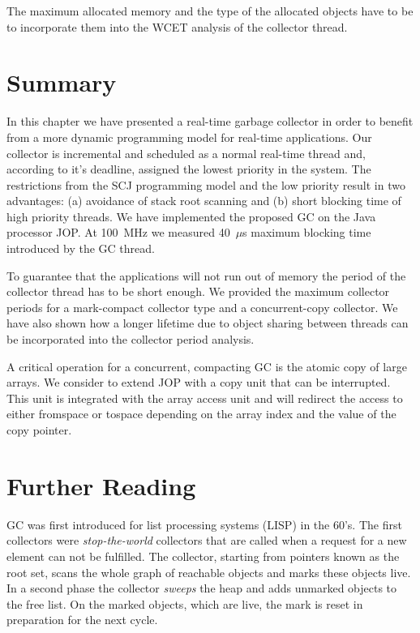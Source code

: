 The maximum allocated memory and the type of the allocated objects
have to be to incorporate them into the WCET analysis of the
collector thread.

\section{Summary} \label{sec:gc:summery}

In this chapter we have presented a real-time garbage collector in
order to benefit from a more dynamic programming model for real-time
applications. Our collector is incremental and scheduled as a normal
real-time thread and, according to it's deadline, assigned the
lowest priority in the system. The restrictions from the SCJ
programming model and the low priority result in two advantages: (a)
avoidance of stack root scanning and (b) short blocking time of high
priority threads. We have implemented the proposed GC on the Java
processor JOP. At 100~MHz we measured 40~$\mu$s maximum blocking
time introduced by the GC thread.

To guarantee that the applications will not run out of memory the
period of the collector thread has to be short enough. We provided
the maximum collector periods for a mark-compact collector type and
a concurrent-copy collector. We have also shown how a longer
lifetime due to object sharing between threads can be incorporated
into the collector period analysis.

A critical operation for a concurrent, compacting GC is the atomic
copy of large arrays. We consider to extend JOP with a copy unit
that can be interrupted. This unit is integrated with the array
access unit and will redirect the access to either fromspace or
tospace depending on the array index and the value of the copy
pointer.

\section{Further Reading}

GC was first introduced for list processing systems (LISP) in the
60's. The first collectors were \emph{stop-the-world} collectors
that are called when a request for a new element can not be
fulfilled. The collector, starting from pointers known as the root
set, scans the whole graph of reachable objects and marks these
objects live. In a second phase the collector \emph{sweeps} the heap
and adds unmarked objects to the free list. On the marked objects,
which are live, the mark is reset in preparation for the next cycle.

